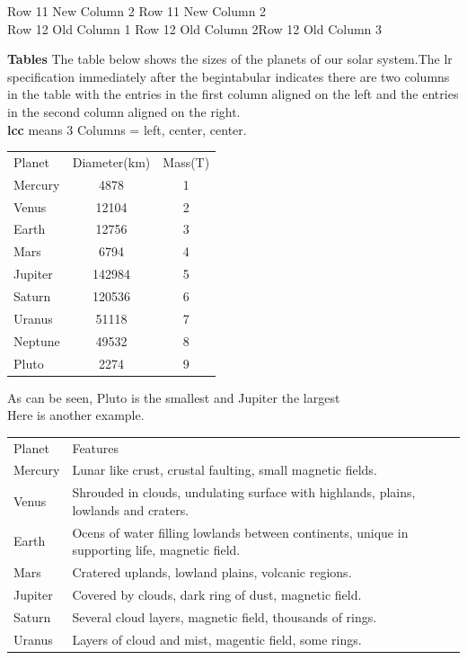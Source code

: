 \documentclass{article}
\theoremstyle{definition}
\theoremstyle{remark}
\theoremstyle{plain}
\numberwithin{equation}{subsection}
\begin{document}
{\begin{tabbing}
	\> Row 11 New Column 2 \> Row 11 New Column 2\\[5pt]
	\poptabs
	Row 12 Old Column 1\> Row 12 Old Column 2\>Row 12 Old Column 3
\end{tabbing}
\textbf{Tables}
\noindent The table below shows the sizes of the planets of our solar system.The {lr} specification immediately after the begin{tabular} indicates there are two columns in the table with the entries in the first column aligned on the left and the entries in the second column aligned on the right.\\
\textbf{lcc} means 3 Columns = left, center, center.
\begin{center}
	\begin{tabular}{lcc}
		Planet & Diameter(km) & Mass(T)\\[5pt]
		Mercury & 4878 & 1\\
		Venus & 12104 & 2\\
		Earth & 12756 & 3\\
		Mars & 6794 & 4 \\
		Jupiter & 142984 & 5\\
		Saturn & 120536 & 6\\
		Uranus & 51118 & 7\\
		Neptune & 49532 & 8\\
		Pluto & 2274 & 9
	\end{tabular}
\end{center}
As can be seen, Pluto is the smallest and Jupiter the largest\\
Here is another example.
\begin{center}
	\begin{tabular}{lp{.8\linewidth}}
		Planet & Features\\[5pt]
		Mercury & Lunar like crust, crustal faulting, small magnetic
		fields.\\
		Venus & Shrouded in clouds, undulating surface with highlands,
		plains, lowlands and craters.\\
		Earth & Ocens of water filling lowlands between continents,
		unique in supporting life, magnetic field.\\
		Mars & Cratered uplands, lowland plains, volcanic regions.\\
		Jupiter & Covered by clouds, dark ring of dust, magnetic field.\\
		Saturn & Several cloud layers, magnetic field, thousands
		of rings.\\
		Uranus & Layers of cloud and mist, magentic field, some rings.\\

\end{tabular}
\end{center}}
\end{document}
